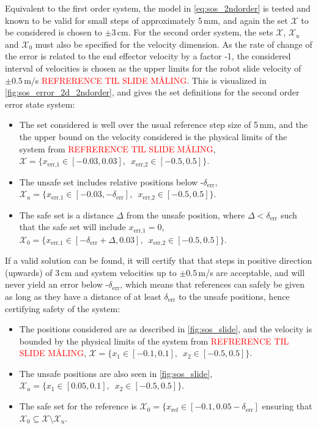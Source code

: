 Equivalent to the first order system, the model in \autoref{eq:sos_2ndorder} is tested and known to be valid for small steps of approximately 5\,mm, and again the set $\mathcal{X}$ to be considered is chosen to $\pm 3$\,cm.
For the second order system, the sets $\mathcal{X}$, $\mathcal{X}_u$ and $\mathcal{X}_0$ must also be specified for the velocity dimension. As the rate of change of the error is related to the end effector velocity by a factor -1, the considered interval of velocities is chosen as the upper limits for the robot slide velocity of $\pm 0.5$\,m/s \textcolor{red}{REFRERENCE TIL SLIDE M\AA LING}. This is visualized in \autoref{fig:sos_error_2d_2ndorder}, and gives the set definitions for the second order error state system:
\vspace{-2mm}
\begin{itemize}
\itemsep-0.7mm
\item The set considered is well over the usual reference step size of 5\,mm, and the the upper bound on the velocity  considered is the physical limits of the system from \textcolor{red}{REFRERENCE TIL SLIDE M\AA LING}, $\mathcal{X}=\{x_\text{err,1}\in[-0.03,0.03], \,\,\, x_\text{err,2}\in[-0.5,0.5] \}$.
\item The unsafe set includes relative positions below -$\delta_\text{err}$, $\mathcal{X}_u=\{x_\text{err,1}\in[-0.03,-\delta_\text{err}],\,\,\, x_\text{err,2}\in[-0.5,0.5] \}$.
\item The safe set is a distance $\Delta$ from the unsafe position, where $\Delta<\delta_\text{err}$ such that the safe set will include $x_\text{err,1}=0$, $\mathcal{X}_0=\{x_\text{err,1}\in[-\delta_\text{err}+\Delta,0.03], \,\,\, x_\text{err,2}\in[-0.5,0.5] \}$.
\end{itemize}

If a valid solution can be found, it will certify that that steps in positive direction (upwards) of 3\,cm and system velocities up to $\pm 0.5$\,m/s are acceptable, and will never yield an error below -$\delta_\text{err}$, which means that references can safely be given as long as they have a distance of at least $\delta_\text{err}$ to the unsafe positions, hence certifying safety of the system:
\vspace{-2mm}
\begin{itemize}
\itemsep-0.7mm
\item The positions considered are as described in \autoref{fig:sos_slide}, and the velocity is bounded by the physical limits of the system from \textcolor{red}{REFRERENCE TIL SLIDE M\AA LING}, $\mathcal{X}=\{x_1\in[-0.1,0.1],\,\,\, x_2\in[-0.5,0.5] \}$.
\item The unsafe positions are also seen in \autoref{fig:sos_slide}, $\mathcal{X}_u=\{x_1\in[0.05,0.1],\,\,\, x_2\in[-0.5,0.5] \}$.
\item The safe set for the reference is $\mathcal{X}_0=\{x_\text{ref}\in[-0.1,0.05-\delta_\text{err}]$ ensuring that $\mathcal{X}_0\subseteq\mathcal{X}\setminus\mathcal{X}_u$.
\end{itemize}

